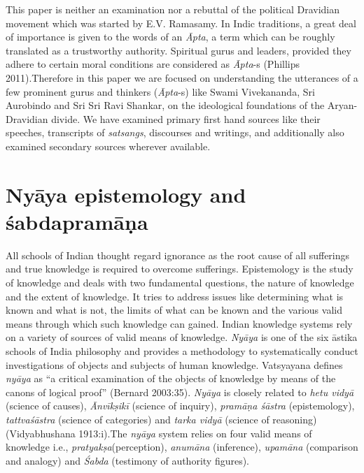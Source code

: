 This paper is neither an examination nor a rebuttal of the political Dravidian movement which was started by E.V. Ramasamy. In Indic traditions, a great deal of importance is given to the words of an \textit{Āpta}, a term which can be roughly translated as a trustworthy authority. Spiritual gurus and leaders, provided they adhere to certain moral conditions are considered as \textit{Āpta}-s (Phillips 2011).Therefore in this paper we are focused on understanding the utterances of a few prominent gurus and thinkers (\textit{Āpta}-s) like Swami Vivekananda, Sri Aurobindo and Sri Sri Ravi Shankar, on the ideological foundations of the Aryan-Dravidian divide. We have examined primary first hand sources like their speeches, transcripts of \textit{satsangs}, discourses and writings, and additionally also examined secondary sources wherever available.


\section*{Nyāya epistemology and śabdapramāṇa}

All schools of Indian thought regard ignorance as the root cause of all sufferings and true knowledge is required to overcome sufferings. Epistemology is the study of knowledge and deals with two fundamental questions, the nature of knowledge and the extent of knowledge. It tries to address issues like determining what is known and what is not, the limits of what can be known and the various valid means through which such knowledge can gained. Indian knowledge systems rely on a variety of sources of valid means of knowledge. \textit{Nyāya} is one of the six āstika schools of India philosophy and provides a methodology to systematically conduct investigations of objects and subjects of human knowledge. Vatsyayana defines \textit{nyāya} as “a critical examination of the objects of knowledge by means of the canons of logical proof” (Bernard 2003:35). \textit{Nyāya} is closely related to \textit{hetu vidyā} (science of causes), \textit{Ānvīkṣikī} (science of inquiry), \textit{pramāṇa śāstra} (epistemology), \textit{tattvaśāstra} (science of categories) and \textit{tarka vidyā} (science of reasoning) (Vidyabhushana 1913:i).The \textit{nyāya} system relies on four valid means of knowledge i.e., \textit{pratyakṣa}(perception), \textit{anumāna} (inference), \textit{upamāna} (comparison and analogy) and \textit{Śabda} (testimony of authority figures).

